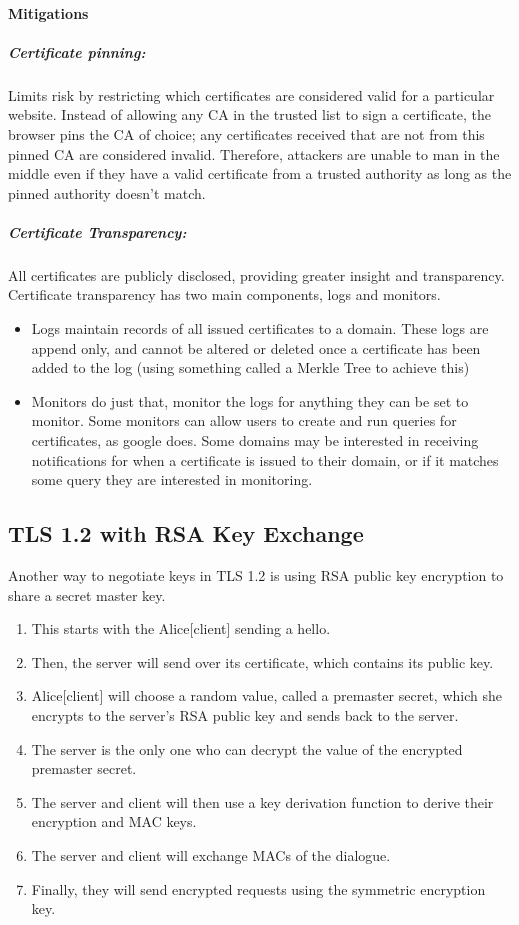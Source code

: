 \documentclass[11pt]{article} %
\begin{document}
\paragraph{Mitigations}
\subparagraph {Certificate pinning:} Limits risk by restricting which certificates are considered valid for a particular website. Instead of allowing any CA in the trusted list to sign a certificate, the browser pins the CA of choice; any certificates received that are not from this pinned CA are considered invalid. Therefore, attackers are unable to man in the middle even if they have a valid certificate from a trusted authority as long as the pinned authority doesn't match.
\subparagraph {Certificate Transparency:} All certificates are publicly disclosed, providing greater insight and transparency. Certificate transparency has two main components, logs and monitors.
 \begin{itemize}
    \item Logs maintain records of all issued certificates to a domain. These logs are append only, and cannot be altered or deleted once a certificate has been added to the log (using something called a Merkle Tree to achieve this)
    \item Monitors do just that, monitor the logs for anything they can be set to monitor. Some monitors can allow users to create and run queries for certificates, as google does. Some domains may be interested in receiving notifications for when a certificate is issued to their domain, or if it matches some query they are interested in monitoring.
\end{itemize}

\newpage
\subsection{TLS 1.2 with RSA Key Exchange}
Another way to negotiate keys in TLS 1.2 is using RSA public key encryption to 
share a secret master key.

\begin{enumerate}
  \item This starts with the Alice[client] sending a hello.
  \item Then, the server will send over its certificate, which contains its 
  public key.
  \item Alice[client] will choose a random value, called a premaster secret, 
  which she encrypts to the server's RSA public key and sends back to the 
  server.
  \item The server is the only one who can decrypt the value of the encrypted 
  premaster secret.
  \item The server and client will then use a key derivation function to 
  derive their encryption and MAC keys.
  \item The server and client will exchange MACs of the dialogue.
  \item Finally, they will send encrypted requests using the symmetric 
  encryption key.
\end{enumerate}
\end{document}
